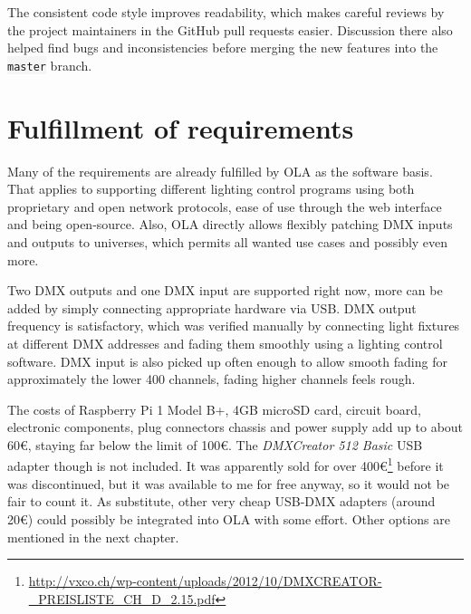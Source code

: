 The consistent code style improves readability, which makes careful
reviews by the project maintainers in the GitHub pull requests easier.
Discussion there also helped find bugs and inconsistencies before
merging the new features into the \colorbox{WhiteSmoke}{\lstinline!master!} branch.

\section{Fulfillment of
requirements}\label{sec:fulfillment-requirements}

Many of the requirements are already fulfilled by OLA as the software
basis. That applies to supporting different lighting control programs
using both proprietary and open network protocols, ease of use through
the web interface and being open-source. Also, OLA directly allows
flexibly patching DMX inputs and outputs to universes, which permits all
wanted use cases and possibly even more.

Two DMX outputs and one DMX input are supported right now, more can be
added by simply connecting appropriate hardware via USB. DMX output
frequency is satisfactory, which was verified manually by connecting
light fixtures at different DMX addresses and fading them smoothly using
a lighting control software. DMX input is also picked up often enough to
allow smooth fading for approximately the lower 400 channels, fading
higher channels feels rough.

The costs of Raspberry Pi 1 Model B+, 4GB microSD card, circuit board,
electronic components, plug connectors chassis and power supply add up
to about 60\euro{}, staying far below the limit of 100\euro{}. The
\emph{DMXCreator 512 Basic} USB adapter though is not included. It was
apparently sold for over 400\euro{}\footnote{\url{http://vxco.ch/wp-content/uploads/2012/10/DMXCREATOR-_PREISLISTE_CH_D_2.15.pdf}}
before it was discontinued, but it was available to me for free anyway,
so it would not be fair to count it. As substitute, other very cheap
USB-DMX adapters (around 20\euro{}) could possibly be integrated into
OLA with some effort. Other options are mentioned in the next chapter.

